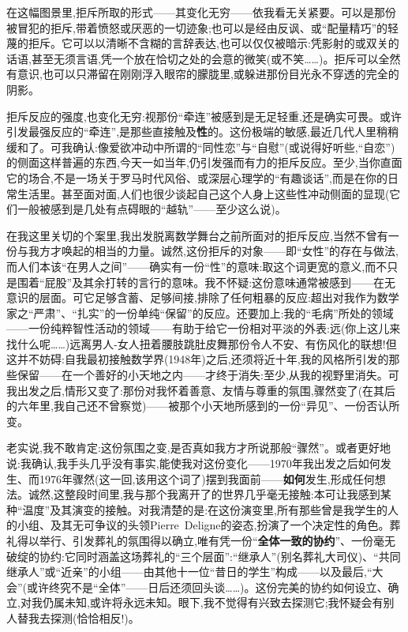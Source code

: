 在这幅图景里,拒斥所取的形式——其变化无穷——依我看无关紧要。可以是那份被冒犯的拒斥,带着愤怒或厌恶的一切迹象;也可以是经由反讽、或“配量精巧”的轻蔑的拒斥。它可以以清晰不含糊的言辞表达,也可以仅仅被暗示:凭影射的或双关的话语,甚至无须言语,凭一个放在恰切之处的会意的微笑(或不笑……)。拒斥可以全然有意识,也可以只滞留在刚刚浮入眼帘的朦胧里,或躲进那份目光永不穿透的完全的阴影。

拒斥反应的强度,也变化无穷\dmark{}:视那份“牵连”被感到是无足轻重,还是确实可畏。或许引发最强反应的“牵连”,是那些直接触及\textbf{性}的。这份极端的敏感,最近几代人里稍稍缓和了。可我确认:像爱欲冲动中所谓的“同性恋”与“自慰”(或说得好听些,“自恋”)的侧面这样普遍的东西,今天一如当年,仍引发强而有力的拒斥反应。至少,当你直面它的场合,不是一场关于罗马时代风俗、或深层心理学的“有趣谈话”,而是在你的日常生活里。甚至面对面,人们也很少谈起自己这个人身上这些性冲动侧面的显现(它们一般被感到是几处有点碍眼的“越轨”——至少这么说)。

在我这里关切的个案里,我出发脱离数学舞台之前所面对的拒斥反应,当然不曾有一份与我方才唤起的相当的力量。诚然,这份拒斥的对象——即“女性”的存在与做法,而人们本该“在男人之间”——确实有一份“性”的意味:取这个词更宽的意义,而不只是围着“屁股”及其余打转的言行的意味。我不怀疑:这份意味通常被感到——在无意识的层面。可它足够含蓄、足够间接,排除了任何粗暴的反应:超出对我作为数学家之“严肃”、“扎实”的一份单纯“保留”的反应。还要加上:我的“毛病”所处的领域——一份纯粹智性活动的领域——有助于给它一份相对平淡的外表:远(你上这儿来找什么呢……)远离男人-女人扭着腰肢跳肚皮舞那份令人不安、有伤风化的联想!但这并不妨碍:自我最初接触数学界(1948年)之后,还须将近十年,我的风格所引发的那些保留——在一个善好的小天地之内——才终于消失:至少,从我的视野里消失。可我出发之后,情形又变了:那份对我怀着善意、友情与尊重的氛围,骤然变了(在其后的六年里,我自己还不曾察觉)——被那个小天地所感到的一份“异见”、一份否认所变。

\asterisms

\dmark{}老实说,我不敢肯定:这份氛围之变,是否真如我方才所说那般“骤然”。或者更好地说:我确认,我手头几乎没有事实,能使我对这份变化——1970年我出发之后如何发生、而1976年骤然(这一回,该用这个词了)摆到我面前——\textbf{如何}发生,形成任何想法。诚然,这整段时间里,我与那个我离开了的世界几乎毫无接触:本可让我感到某种“温度”及其演变的接触。对我清楚的是:在这份演变里,所有那些曾是我学生的人的小组、及其无可争议的头领Pierre~Deligne的姿态,扮演了一个决定性的角色。葬礼得以举行、引发葬礼的氛围得以确立,唯有凭一份“\textbf{全体一致的协约}”、一份毫无破绽的协约:它同时涵盖这场葬礼的“三个层面”:“继承人”(别名葬礼大司仪)、“共同继承人”或“近亲”的小组——由其他十一位“昔日的学生”构成——以及最后,“大会”(或许终究不是“全体”——日后还须回头谈……)。这份完美的协约如何设立、确立,对我仍属未知,或许将永远未知。眼下,我不觉得有兴致去探测它;我怀疑会有别人替我去探测(恰恰相反!)。

